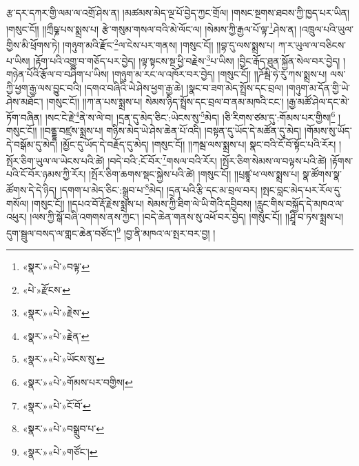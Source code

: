རྩ་དར་དཀར་གྱི་ལམ་ལ་འགྲོ་ཤེས་ན། །མཚམས་མེད་ལྔ་པོ་བྱེད་ཀྱང་གྲོལ། །གསང་སྔགས་ཐབས་ཀྱི་ཁྱད་པར་ཡིན། །གསུང་ངོ།། །།ཀྲྀཥྞ་པས་སྨྲས་པ། རྩེ་གསུམ་གསལ་བའི་མེ་ལོང་ལ། །སེམས་ཀྱི་རྒྱལ་པོ་ལྟ་\footnote{«སྣར་»«པེ་»བལྟ་}ཤེས་ན། །འཁྲུལ་པའི་ཡུལ་གྱིས་མི་ཕྲོགས་ཏེ། །གཉུག་མའི་རྫོང་\footnote{«པེ་»རྫོངས་}ལ་ངེས་པར་གནས། །གསུང་ངོ།། །།བྷ་དུ་ལས་སྨྲས་པ། ཀ་ར་ཡུལ་ལ་བཅིངས་པ་ཡིས། །རྟོག་པའི་འགྱུ་བ་གཅོད་པར་བྱེད། །ལྟ་སྟངས་སྔ་ཕྱི་བརྗེས་\footnote{«སྣར་»«པེ་»རྗེས་}པ་ཡིས། །བྱིང་རྒོད་ཐུན་སྐྱོན་སེལ་བར་བྱེད། །གཉེན་པོའི་རྩོལ་བ་བཤིག་པ་ཡིས། །གཉུག་མ་རང་ལ་འཁོར་བར་བྱེད། །གསུང་ངོ།། །།ཌོམྦི་ཧེ་རུ་ཀས་སྨྲས་པ། ལས་ཀྱི་ཕྱག་རྒྱ་ལས་བྱུང་བའི། །དགའ་བཞིའི་ཡེ་ཤེས་ཕྱག་རྒྱ་ཆེ། །སྣང་བ་ཟག་མེད་སྤྲོས་དང་བྲལ། །གཉུག་མ་དོན་གྱི་ཡེ་ཤེས་མཐོང་། །གསུང་ངོ།། །།ཀ་ན་པས་སྨྲས་པ། སེམས་ཉིད་སྤྲོས་དང་བྲལ་བ་ནམ་མཁའི་ངང་། །རྒྱ་མཚོ་ཤེལ་དང་མེ་ཏོག་བཞིན། །སང་ངེ་རྗེ་\footnote{«སྣར་»«པེ་»རྗེན་}ནེ་ས་ལེ་བ། །དྲན་དུ་མེད་ཅིང་:ཡེངས་སུ་\footnote{«སྣར་»«པེ་»ཡོངས་སུ་}མེད། །ཅི་རིགས་ཙམ་དུ་:གོམས་པར་གྱིས།\footnote{«སྣར་»«པེ་»གོམས་པར་བགྱིས།} །གསུང་ངོ།། །།བནྡྷ་བཛྲས་སྨྲས་པ། གཉིས་མེད་ཡེ་ཤེས་ཆེན་པོ་འདི། །བསྟན་དུ་ཡོད་དེ་མཚོན་དུ་མེད། །གོམས་སུ་ཡོད་དེ་བསྒོམ་དུ་མེད། །མྱོང་དུ་ཡོད་དེ་བརྗོད་དུ་མེད། །གསུང་ངོ།། །།ཀམྦ་ལས་སྨྲས་པ། སྣང་བའི་ངོ་བོ་སྟོང་པའི་རོར། །སྤོར་ཅིག་ཡུལ་ལ་ཡེངས་པའི་ཚེ། །བདེ་བའི་:ངོ་བོར་\footnote{«སྣར་»«པེ་»ངོ་བོ་}གསལ་བའི་རོར། །སྤོར་ཅིག་སེམས་ལ་བལྟས་པའི་ཚེ། །རྟོགས་པའི་ངོ་བོར་ཉམས་ཀྱི་རོར། །སྤོར་ཅིག་ཆགས་སྡང་སྐྱེས་པའི་ཚེ། །གསུང་ངོ།། །།པྲཛྙཱ་ཕ་ལས་སྨྲས་པ། སྣ་ཚོགས་སྣ་ཚོགས་དེ་དེ་ཉིད། །དགག་པ་མེད་ཅིང་:སྒྲུབ་པ་\footnote{«སྣར་»«པེ་»བསྒྲུབ་པ་}མེད། །དྲན་པའི་རྩི་དང་མ་བྲལ་བར། །སྤང་བླང་མེད་པར་རོལ་དུ་གསོལ། །གསུང་ངོ།། །།དཔའ་བོ་རྡོ་རྗེས་སྨྲས་པ། སེམས་ཀྱི་ཐིག་ལེ་ཡི་གེའི་དབྱིབས། །རླུང་གིས་བསྐྱོད་དེ་མཁའ་ལ་འཕུར། །ལས་ཀྱི་སྒོ་བཞི་འགགས་ནས་ཀྱང་། །བདེ་ཆེན་གནས་སུ་འཕོ་བར་བྱེད། །གསུང་ངོ།། །།ཤྲཱི་བ་ཏས་སྨྲས་པ། དུག་སྦྲུལ་བསད་ལ་གླང་ཆེན་བཙོང་།\footnote{«སྣར་»«པེ་»གཙོང་།} །བྱ་ནི་མཁའ་ལ་སྤར་བར་བྱ། །
